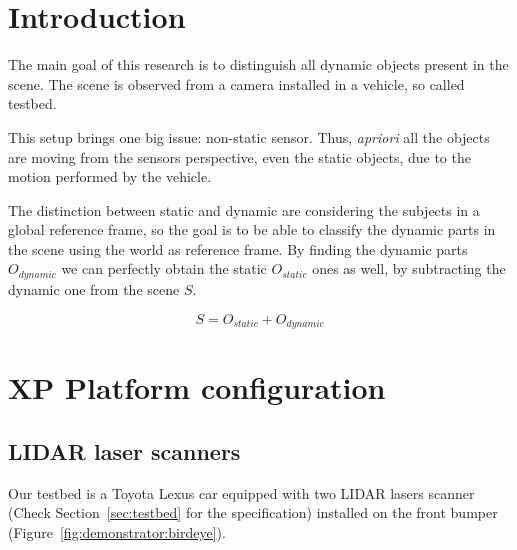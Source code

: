 
\section{Introduction}

The main goal of this research is to distinguish all dynamic objects present in the scene. The scene is observed from a camera installed in a vehicle, so called testbed.

This setup brings one big issue: non-static sensor. Thus, \textit{apriori} all the objects are moving from the sensors perspective, even the static objects, due to the motion performed by the vehicle.

The distinction between static and dynamic are considering the subjects in a global reference frame, so the goal is to be able to classify the dynamic parts in the scene using the world as reference frame. By finding the dynamic parts $O_{dynamic}$ we can perfectly obtain the static $O_{static}$ ones as well, by subtracting the dynamic one from the scene $S$.

\begin{equation}
S=O_{static}+O_{dynamic}
\end{equation}

\section{XP Platform configuration} %
\label{sec:demonstrator}

\subsection{LIDAR laser scanners}

Our testbed is a Toyota Lexus car equipped with two LIDAR lasers scanner (Check Section~\ref{sec:testbed} for the specification) installed on the front bumper (Figure~\ref{fig:demonstrator:birdeye}).

